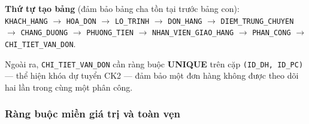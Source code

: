 \documentclass[11pt]{report}
\begin{document}
\noindent\textbf{Thứ tự tạo bảng} (đảm bảo bảng cha tồn tại trước bảng con):\\
\texttt{KHACH\_HANG} $\to$ \texttt{HOA\_DON} $\to$ \texttt{LO\_TRINH} $\to$ \texttt{DON\_HANG} $\to$ \texttt{DIEM\_TRUNG\_CHUYEN} $\to$ \texttt{CHANG\_DUONG} $\to$ \texttt{PHUONG\_TIEN} $\to$ \texttt{NHAN\_VIEN\_GIAO\_HANG} $\to$ \texttt{PHAN\_CONG} $\to$ \texttt{CHI\_TIET\_VAN\_DON}.

\noindent Ngoài ra, \texttt{CHI\_TIET\_VAN\_DON} cần ràng buộc \textbf{UNIQUE} trên cặp \texttt{(ID\_DH, ID\_PC)} --- thể hiện khóa dự tuyển CK2 --- đảm bảo một đơn hàng không được theo dõi hai lần trong cùng một phân công.

\subsubsection{Ràng buộc miền giá trị và toàn vẹn}
\label{subsubsec:check_constraints}
\end{document}
